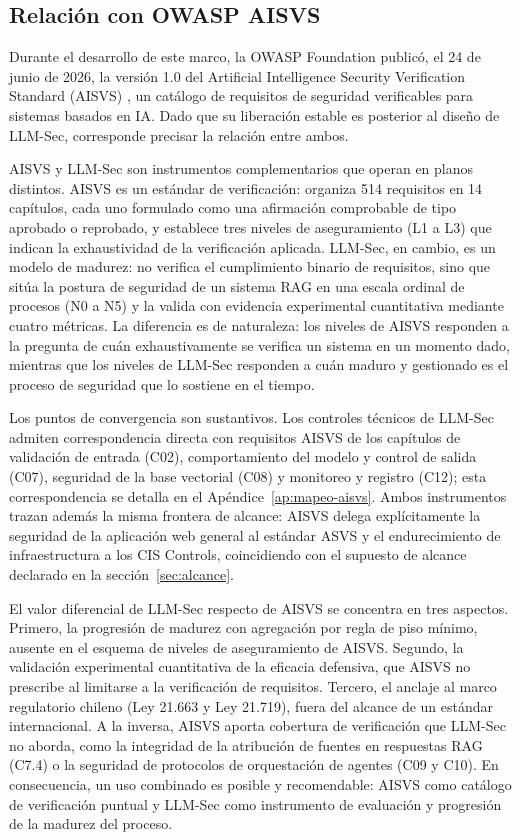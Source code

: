 \subsection{Relación con OWASP AISVS}
\label{sec:relacion-aisvs}

Durante el desarrollo de este marco, la OWASP Foundation publicó, el 24 de junio de 2026, la versión 1.0 del Artificial Intelligence Security Verification Standard (AISVS) \cite{aisvs}, un catálogo de requisitos de seguridad verificables para sistemas basados en IA. Dado que su liberación estable es posterior al diseño de LLM-Sec, corresponde precisar la relación entre ambos.

AISVS y LLM-Sec son instrumentos complementarios que operan en planos distintos. AISVS es un estándar de verificación: organiza 514 requisitos en 14 capítulos, cada uno formulado como una afirmación comprobable de tipo aprobado o reprobado, y establece tres niveles de aseguramiento (L1 a L3) que indican la exhaustividad de la verificación aplicada. LLM-Sec, en cambio, es un modelo de madurez: no verifica el cumplimiento binario de requisitos, sino que sitúa la postura de seguridad de un sistema RAG en una escala ordinal de procesos (N0 a N5) y la valida con evidencia experimental cuantitativa mediante cuatro métricas. La diferencia es de naturaleza: los niveles de AISVS responden a la pregunta de cuán exhaustivamente se verifica un sistema en un momento dado, mientras que los niveles de LLM-Sec responden a cuán maduro y gestionado es el proceso de seguridad que lo sostiene en el tiempo.

Los puntos de convergencia son sustantivos. Los controles técnicos de LLM-Sec admiten correspondencia directa con requisitos AISVS de los capítulos de validación de entrada (C02), comportamiento del modelo y control de salida (C07), seguridad de la base vectorial (C08) y monitoreo y registro (C12); esta correspondencia se detalla en el Apéndice~\ref{ap:mapeo-aisvs}. Ambos instrumentos trazan además la misma frontera de alcance: AISVS delega explícitamente la seguridad de la aplicación web general al estándar ASVS y el endurecimiento de infraestructura a los CIS Controls, coincidiendo con el supuesto de alcance declarado en la sección~\ref{sec:alcance}.

El valor diferencial de LLM-Sec respecto de AISVS se concentra en tres aspectos. Primero, la progresión de madurez con agregación por regla de piso mínimo, ausente en el esquema de niveles de aseguramiento de AISVS. Segundo, la validación experimental cuantitativa de la eficacia defensiva, que AISVS no prescribe al limitarse a la verificación de requisitos. Tercero, el anclaje al marco regulatorio chileno (Ley 21.663 y Ley 21.719), fuera del alcance de un estándar internacional. A la inversa, AISVS aporta cobertura de verificación que LLM-Sec no aborda, como la integridad de la atribución de fuentes en respuestas RAG (C7.4) o la seguridad de protocolos de orquestación de agentes (C09 y C10). En consecuencia, un uso combinado es posible y recomendable: AISVS como catálogo de verificación puntual y LLM-Sec como instrumento de evaluación y progresión de la madurez del proceso.

